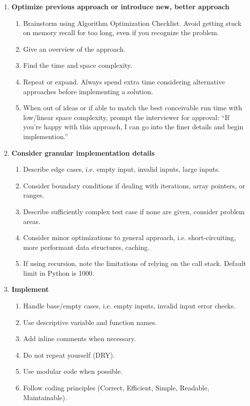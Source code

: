 \documentclass{article}
\begin{document}
\begin{enumerate}
     \item \textbf{Optimize previous approach or introduce new, better approach}

    \begin{enumerate}
        \item Brainstorm using Algorithm Optimization Checklist. Avoid getting stuck on memory recall for too long, even if you recognize the problem.
        \item Give an overview of the approach.
        \item Find the time and space complexity.
        \item Repeat or expand. Always spend extra time considering alternative approaches before implementing a solution.
        \item When out of ideas or if able to match the best conceivable run time with low/linear space complexity, prompt the interviewer for approval: ``If you're happy with this approach, I can go into the finer details and begin implemention.''
    \end{enumerate}
    
     \item \textbf{Consider granular implementation details}

    \begin{enumerate}
        \item Describe edge cases, i.e. empty input, invalid inputs, large inputs.
        \item Consider boundary conditions if dealing with iterations, array pointers, or ranges.
        \item Describe sufficiently complex test case if none are given, consider problem areas.
        \item Consider minor optimizations to general approach, i.e. short-circuiting, more performant data structures, caching.
        \item If using recursion, note the limitations of relying on the call stack. Default limit in Python is 1000.
    \end{enumerate}
    
    \item \textbf{Implement}
    \begin{enumerate}
        \item Handle base/empty cases, i.e. empty inputs, invalid input error checks.
        \item Use descriptive variable and function names.
        \item Add inline comments when necessary.
        \item Do not repeat yourself (DRY).
        \item Use modular code when possible.
        \item Follow coding principles (Correct, Efficient, Simple, Readable, Maintainable).
    \end{enumerate}
    

\end{enumerate}
\end{document}

